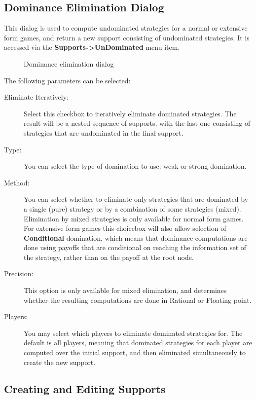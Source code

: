 \documentclass[12pt]{report}
\begin{document}
\subsection{Dominance Elimination Dialog}\label{UnDominated}

This dialog is used to compute undominated strategies for a normal or
extensive form games, and return a new support consisting of
undominated strategies.  It is accessed via the {\bf 
Supports->UnDominated} menu item.

\begin{figure}
\caption{Dominance elimination dialog}\label{fig_elimdomd}
\end{figure}

The following parameters can be selected:

\begin{description}
\item[Eliminate Iteratively:] Select this checkbox to iteratively
eliminate dominated strategies. The result will be a nested sequence
of supports, with the last one consisting of strategies that are
undominated in the final support.
\item[Type:] You can select the type of domination to use: weak or
strong domination.  
\item[Method:] You can select whether to eliminate only strategies
that are dominated by a single (pure) strategy or by a combination of
some strategies (mixed).  Elimination by mixed strategies is only
available for normal form games.  For extensive form games this
choicebox will also allow selection of {\bf Conditional} domination,
which means that dominance computations are done using payoffs that
are conditional on reaching the information set of the strategy,
rather than on the payoff at the root node.
\item[Precision:] This option is only available for mixed elimination,
and determines whether the resulting computations are done in Rational
or Floating point.  
\item[Players:] You may select which players to eliminate dominated
strategies for. The default is all players, meaning that dominated
strategies for each player are computed over the initial support, and
then eliminated simultaneously to create the new support.
\end{description}

\subsection{Creating and Editing Supports}\label{EditSupport}
\end{document}
